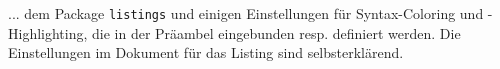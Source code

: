 
... dem Package \texttt{listings} und einigen Einstellungen für Syntax-Coloring und -Highlighting, die in der Präambel eingebunden resp. definiert werden. Die Einstellungen im Dokument für das Listing sind selbsterklärend.
